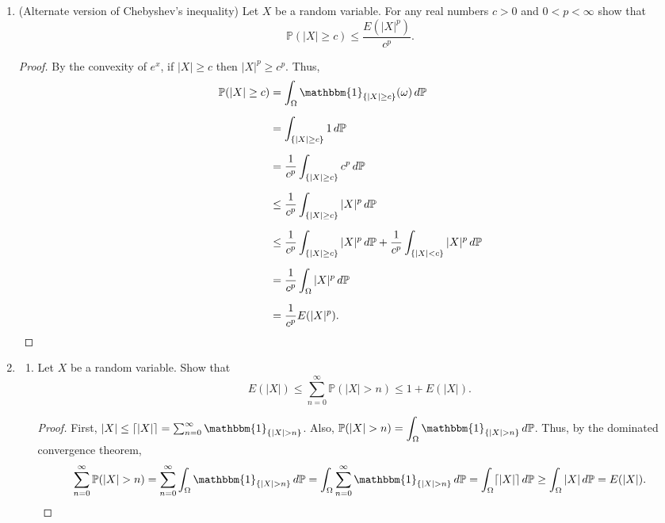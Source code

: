 \documentclass[11pt,oneside,english]{amsart}
\DeclarePairedDelimiter{\ceil}{\lceil}{\rceil}
\theoremstyle{definition}
\newcommand{\1}{\mathbbm{1}}
\newcommand{\p}{\mathbb{P}}
\begin{document}
\begin{enumerate}[leftmargin=*]
\begin{proof}
So $g(X_n)\xrightarrow{d} g(X)$.
\end{proof}








\pagebreak







\item (Alternate version of Chebyshev's inequality) Let $X$ be a random variable. For any real numbers $c>0$ and $0<p<\infty$ show that 
\[
\p(|X|\geq c)\leq \frac{E(|X|^p)}{c^p}.
\]

\begin{proof}
By the convexity of $e^x$, if $|X|\geq c$ then $|X|^p\geq c^p$. Thus,
\begin{align*}
\p(|X|\geq c)&=\int_\Omega \1_{\{|X|\geq c\}}(\omega)\,d\p\\[2mm]
&=\int_{\{|X|\geq c\}}1\,d\p\\[2mm]
&=\frac{1}{c^p}\int_{\{|X|\geq c\}}c^p\,d\p\\[2mm]
&\leq\frac{1}{c^p}\int_{\{|X|\geq c\}}|X|^p\,d\p\\[2mm]
&\leq\frac{1}{c^p}\int_{\{|X|\geq c\}}|X|^p\,d\p+\frac{1}{c^p}\int_{\{|X|<c\}}|X|^p\,d\p\\[2mm]
&=\frac{1}{c^p}\int_\Omega|X|^p\,d\p\\[2mm]
&=\frac{1}{c^p}E(|X|^p).\qedhere
\end{align*}
\end{proof}







\pagebreak








\item \begin{enumerate}\itemsep5mm \item Let $X$ be a random variable. Show that
\[
E(|X|)\leq \sum_{n=0}^\infty \p(|X|> n)\leq 1+E(|X|).
\]

\begin{proof}
First, $|X|\leq \ceil{|X|}=\sum_{n=0}^\infty \1_{\{|X|>n\}}$. Also, $\displaystyle \p(|X|> n)=\int_\Omega \1_{\{|X|>  n\}}\,d\p$. Thus, by the dominated convergence theorem,
\[
\sum_{n=0}^\infty \p(|X|>  n)=\sum_{n=0}^\infty \int_\Omega \1_{\{|X|>  n\}}\,d\p= \int_\Omega \sum_{n=0}^\infty\1_{\{|X|>  n\}}\,d\p= \int_\Omega\ceil{|X|}\,d\p\geq\int_\Omega |X|\,d\p=E(|X|).
\]


\end{proof}
\end{enumerate}
\end{enumerate}
\end{document}
